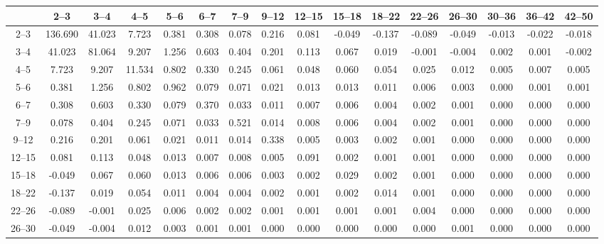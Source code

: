 \begin{table}[tb]
    {\renewcommand{\tabcolsep}{0.1cm} \begin{tabular}{c|ccccccccccccccc}
    \hline
           &    2--3 &   3--4 &   4--5 &   5--6 &   6--7 &   7--9 &  9--12 & 12--15 & 15--18 & 18--22 & 22--26 & 26--30 & 30--36 & 36--42 & 42--50 \\
    \hline
    2--3   & 136.690 & 41.023 &  7.723 &  0.381 &  0.308 &  0.078 &  0.216 &  0.081 & -0.049 & -0.137 & -0.089 & -0.049 & -0.013 & -0.022 & -0.018 \\
    3--4   &  41.023 & 81.064 &  9.207 &  1.256 &  0.603 &  0.404 &  0.201 &  0.113 &  0.067 &  0.019 & -0.001 & -0.004 &  0.002 &  0.001 & -0.002 \\
    4--5   &   7.723 &  9.207 & 11.534 &  0.802 &  0.330 &  0.245 &  0.061 &  0.048 &  0.060 &  0.054 &  0.025 &  0.012 &  0.005 &  0.007 &  0.005 \\
    5--6   &   0.381 &  1.256 &  0.802 &  0.962 &  0.079 &  0.071 &  0.021 &  0.013 &  0.013 &  0.011 &  0.006 &  0.003 &  0.000 &  0.001 &  0.001 \\
    6--7   &   0.308 &  0.603 &  0.330 &  0.079 &  0.370 &  0.033 &  0.011 &  0.007 &  0.006 &  0.004 &  0.002 &  0.001 &  0.000 &  0.000 &  0.000 \\
    7--9   &   0.078 &  0.404 &  0.245 &  0.071 &  0.033 &  0.521 &  0.014 &  0.008 &  0.006 &  0.004 &  0.002 &  0.001 &  0.000 &  0.000 &  0.000 \\
    9--12  &   0.216 &  0.201 &  0.061 &  0.021 &  0.011 &  0.014 &  0.338 &  0.005 &  0.003 &  0.002 &  0.001 &  0.000 &  0.000 &  0.000 &  0.000 \\
    12--15 &   0.081 &  0.113 &  0.048 &  0.013 &  0.007 &  0.008 &  0.005 &  0.091 &  0.002 &  0.001 &  0.001 &  0.000 &  0.000 &  0.000 &  0.000 \\
    15--18 &  -0.049 &  0.067 &  0.060 &  0.013 &  0.006 &  0.006 &  0.003 &  0.002 &  0.029 &  0.002 &  0.001 &  0.000 &  0.000 &  0.000 &  0.000 \\
    18--22 &  -0.137 &  0.019 &  0.054 &  0.011 &  0.004 &  0.004 &  0.002 &  0.001 &  0.002 &  0.014 &  0.001 &  0.000 &  0.000 &  0.000 &  0.000 \\
    22--26 &  -0.089 & -0.001 &  0.025 &  0.006 &  0.002 &  0.002 &  0.001 &  0.001 &  0.001 &  0.001 &  0.004 &  0.000 &  0.000 &  0.000 &  0.000 \\
    26--30 &  -0.049 & -0.004 &  0.012 &  0.003 &  0.001 &  0.001 &  0.000 &  0.000 &  0.000 &  0.000 &  0.000 &  0.001 &  0.000 &  0.000 &  0.000 \\

\end{tabular}}
\end{table}
